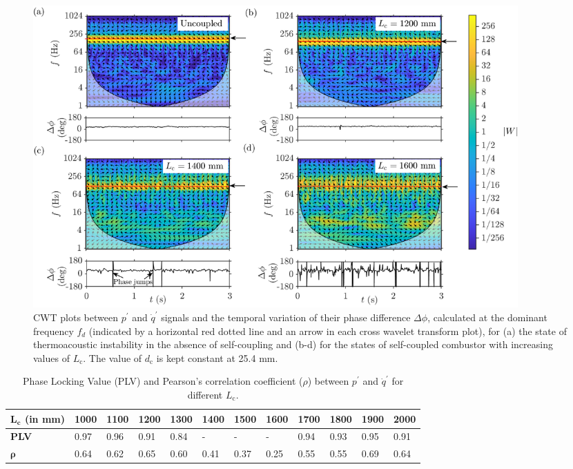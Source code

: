 \documentclass[twocolumn,10pt]{article} %
\begin{document}
\begin{figure}[t!]
\centering
\includegraphics[width=0.9\textwidth]{all_copy.png}
\caption{CWT plots between $p^\prime$ and $\dot{q}^\prime$ signals and the temporal variation of their phase difference $\Delta\phi$, calculated at the dominant frequency $f_d$ (indicated by a horizontal red dotted line and an arrow in each cross wavelet transform plot), for (a) the state of thermoacoustic instability in the absence of self-coupling and (b-d) for the states of self-coupled combustor with increasing values of $L_{\text{c}}$. The value of $d_{\text{c}}$ is kept constant at 25.4 mm. }
\label{fig4}
\end{figure}

\begin{table}[!b] \small
\centering
\caption{\label{table} Phase Locking Value (PLV) and Pearson's correlation coefficient ($\rho$) between $p^\prime$ and $\dot{q}^\prime$ for different $L_{\text{c}}$.}
\begin{tabular}{|l|l|l|l|l|l|l|l|l|l|l|l|}
\hline
 $\mathbf{L_{\text{c}}}$ \textbf{(in mm)}                   & \textbf{1000}  & \textbf{1100}  & \textbf{1200}  & \textbf{1300}  & \textbf{1400}  & \textbf{1500}  & \textbf{1600}  & \textbf{1700}  & \textbf{1800}  & \textbf{1900}  & \textbf{2000}  \\
\hline
\textbf{PLV}                 & 0.97 & 0.96 & 0.91 & 0.84 &   -   &    -  &   -   & 0.94 & 0.93 & 0.95 & 0.91 \\
\hline
$\boldsymbol{\rho}$ & 0.64 & 0.62 & 0.65 & 0.60 & 0.41 & 0.37 & 0.25 & 0.55 & 0.55 & 0.69 & 0.64 \\
\hline
\end{tabular}
\label{table}
\end{table}
\end{document}
